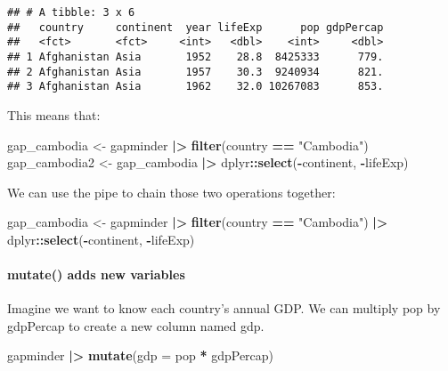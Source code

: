 \documentclass[
]{article}
\newenvironment{Shaded}{\begin{snugshade}}{\end{snugshade}}
\newcommand{\AttributeTok}[1]{\textcolor[rgb]{0.13,0.29,0.53}{#1}}
\newcommand{\FunctionTok}[1]{\textcolor[rgb]{0.13,0.29,0.53}{\textbf{#1}}}
\newcommand{\NormalTok}[1]{#1}
\newcommand{\OtherTok}[1]{\textcolor[rgb]{0.56,0.35,0.01}{#1}}
\newcommand{\SpecialCharTok}[1]{\textcolor[rgb]{0.81,0.36,0.00}{\textbf{#1}}}
\newcommand{\StringTok}[1]{\textcolor[rgb]{0.31,0.60,0.02}{#1}}
\begin{document}
\begin{verbatim}
## # A tibble: 3 x 6
##   country     continent  year lifeExp      pop gdpPercap
##   <fct>       <fct>     <int>   <dbl>    <int>     <dbl>
## 1 Afghanistan Asia       1952    28.8  8425333      779.
## 2 Afghanistan Asia       1957    30.3  9240934      821.
## 3 Afghanistan Asia       1962    32.0 10267083      853.
\end{verbatim}

This means that:

\begin{Shaded}
\begin{Highlighting}[]
\NormalTok{gap\_cambodia }\OtherTok{\textless{}{-}}\NormalTok{ gapminder }\SpecialCharTok{|\textgreater{}} \FunctionTok{filter}\NormalTok{(country }\SpecialCharTok{==} \StringTok{"Cambodia"}\NormalTok{)}
\NormalTok{gap\_cambodia2 }\OtherTok{\textless{}{-}}\NormalTok{ gap\_cambodia }\SpecialCharTok{|\textgreater{}}\NormalTok{ dplyr}\SpecialCharTok{::}\FunctionTok{select}\NormalTok{(}\SpecialCharTok{{-}}\NormalTok{continent, }\SpecialCharTok{{-}}\NormalTok{lifeExp)}
\end{Highlighting}
\end{Shaded}

We can use the pipe to chain those two operations together:

\begin{Shaded}
\begin{Highlighting}[]
\NormalTok{gap\_cambodia }\OtherTok{\textless{}{-}}\NormalTok{ gapminder }\SpecialCharTok{|\textgreater{}}
 \FunctionTok{filter}\NormalTok{(country }\SpecialCharTok{==} \StringTok{"Cambodia"}\NormalTok{) }\SpecialCharTok{|\textgreater{}}
\NormalTok{ dplyr}\SpecialCharTok{::}\FunctionTok{select}\NormalTok{(}\SpecialCharTok{{-}}\NormalTok{continent, }\SpecialCharTok{{-}}\NormalTok{lifeExp)}
\end{Highlighting}
\end{Shaded}

\paragraph{mutate() adds new variables}\label{mutate-adds-new-variables}

Imagine we want to know each country's annual GDP. We can multiply pop
by gdpPercap to create a new column named gdp.

\begin{Shaded}
\begin{Highlighting}[]
\NormalTok{gapminder }\SpecialCharTok{|\textgreater{}}
\FunctionTok{mutate}\NormalTok{(}\AttributeTok{gdp =}\NormalTok{ pop }\SpecialCharTok{*}\NormalTok{ gdpPercap)}
\end{Highlighting}
\end{Shaded}
\end{document}
